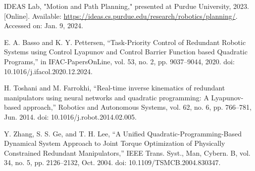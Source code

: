\documentclass[letterpaper, 10 pt, conference]{ieeeconf}  %
\begin{document}
\begin{thebibliography}{99}
	
IDEAS Lab, "Motion and Path Planning," presented at Purdue University, 2023. [Online]. Available: \url{https://ideas.cs.purdue.edu/research/robotics/planning/}. Accessed on: Jan. 9, 2024.
	
 E. A. Basso and K. Y. Pettersen, “Task-Priority Control of Redundant Robotic Systems using Control Lyapunov and Control Barrier Function based Quadratic Programs,” in IFAC-PapersOnLine, vol. 53, no. 2, pp. 9037–9044, 2020. doi: 10.1016/j.ifacol.2020.12.2024.


 H. Toshani and M. Farrokhi, “Real-time inverse kinematics of redundant manipulators using neural networks and quadratic programming: A Lyapunov-based approach,” Robotics and Autonomous Systems, vol. 62, no. 6, pp. 766–781, Jun. 2014. doi: 10.1016/j.robot.2014.02.005.

 Y. Zhang, S. S. Ge, and T. H. Lee, “A Unified Quadratic-Programming-Based Dynamical System Approach to Joint Torque Optimization of Physically Constrained Redundant Manipulators,” IEEE Trans. Syst., Man, Cybern. B, vol. 34, no. 5, pp. 2126–2132, Oct. 2004. doi: 10.1109/TSMCB.2004.830347.



\end{thebibliography}
\end{document}
